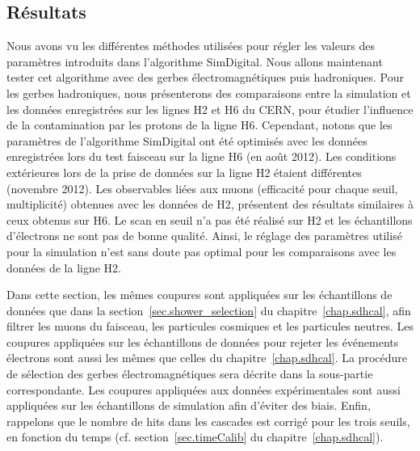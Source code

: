 \subsection{Résultats}
\label{sec.resultats}
Nous avons vu les différentes méthodes utilisées pour régler les valeurs des paramètres introduits dans l'algorithme SimDigital. Nous allons maintenant tester cet algorithme avec des gerbes électromagnétiques puis hadroniques. Pour les gerbes hadroniques, nous présenterons des comparaisons entre la simulation et les données enregistrées sur les lignes H2 et H6 du CERN, pour étudier l'influence de la contamination par les protons de la ligne H6. Cependant, notons que les paramètres de l'algorithme SimDigital ont été optimisés avec les données enregistrées lors du test faisceau sur la ligne H6 (en août 2012). Les conditions extérieures lors de la prise de données sur la ligne H2 étaient différentes (novembre 2012). Les observables liées aux muons (efficacité pour chaque seuil, multiplicité) obtenues avec les données de H2, présentent des résultats similaires à ceux obtenus sur H6. Le scan en seuil n'a pas été réalisé sur H2 et les échantillons d'électrons ne sont pas de bonne qualité. Ainsi, le réglage des paramètres utilisé pour la simulation n'est sans doute pas optimal pour les comparaisons avec les données de la ligne H2. 

Dans cette section, les mêmes coupures sont appliquées sur les échantillons de données que dans la section~\ref{sec.shower_selection} du chapitre~\ref{chap.sdhcal}, afin filtrer les muons du faisceau, les particules cosmiques et les particules neutres. Les coupures appliquées sur les échantillons de données pour rejeter les événements électrons sont aussi les mêmes que celles du chapitre~\ref{chap.sdhcal}. La procédure de sélection des gerbes électromagnétiques sera décrite dans la sous-partie correspondante. Les coupures appliquées aux données expérimentales sont aussi appliquées sur les échantillons de simulation afin d'éviter des biais. 
Enfin, rappelons que le nombre de hits dans les cascades est corrigé pour les trois seuils, en fonction du temps (cf. section~\ref{sec.timeCalib} du chapitre~\ref{chap.sdhcal}).


